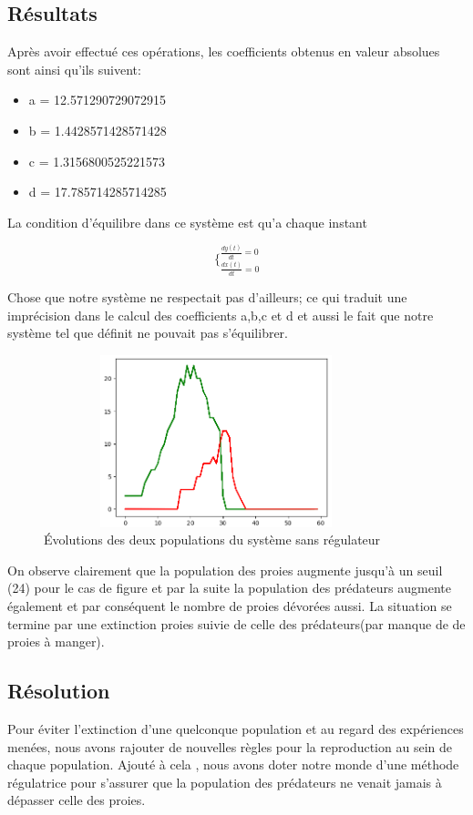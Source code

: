 \documentclass[a4paper,12pt]{article} %
\begin{document}
\subsection{Résultats}
Après avoir effectué ces opérations, les coefficients obtenus en valeur absolues sont ainsi qu'ils suivent:

\begin{itemize}
    \item a = 12.571290729072915
    \item b = 1.4428571428571428
    \item c = 1.3156800525221573
    \item d = 17.785714285714285
\end{itemize}

La condition d'équilibre dans ce système est qu'a chaque instant 

\begin{equation}
    \lbrace_{\frac{dx(t)}{dt} = 0}^{\frac{dy(t)}{dt} = 0}
\end{equation}

 Chose que notre système ne respectait pas d'ailleurs; ce qui traduit une imprécision dans le calcul des coefficients a,b,c et d et aussi le fait que notre système tel que définit ne pouvait pas s'équilibrer.

\begin{figure}[h]
    \centering
    \includegraphics[width=10cm, height=5cm]{images/non_eq.png}
    \caption{Évolutions des deux populations du système sans régulateur}
\end{figure}

On observe clairement que la population des proies augmente jusqu'à un seuil (24) pour le cas de figure et par la suite la population des prédateurs augmente également et par conséquent le nombre de proies dévorées aussi. La situation se termine par une extinction proies suivie de celle des prédateurs(par manque de de proies à manger).

\subsection{Résolution}
Pour éviter l'extinction d'une quelconque population et au regard des expériences menées, nous avons rajouter de nouvelles règles pour la reproduction au sein de chaque population. Ajouté à cela , nous avons doter notre monde d'une méthode régulatrice pour s'assurer que la population des prédateurs ne venait jamais à dépasser celle des proies.
\end{document}
